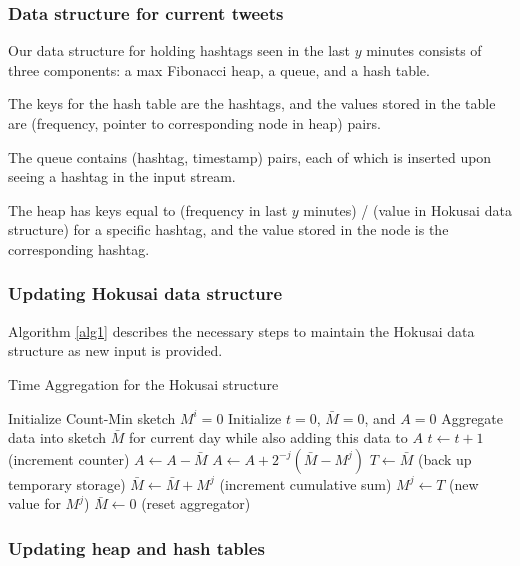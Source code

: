 \documentclass[a4paper,12pt]{article}
\begin{document}
\subsubsection{Data structure for current tweets}

Our data structure for holding hashtags seen in the last $y$ minutes consists of three components: a max Fibonacci heap, a queue, and a hash table.

The keys for the hash table are the hashtags, and the values stored in the table are (frequency, pointer to corresponding node in heap) pairs.

The queue contains (hashtag, timestamp) pairs, each of which is inserted upon seeing a hashtag in the input stream.

The heap has keys equal to (frequency in last $y$ minutes) / (value in Hokusai data structure) for a specific hashtag, and the value stored in the node is the corresponding hashtag.

\subsubsection{Updating Hokusai data structure\label{Hokusai}}

Algorithm \ref{alg1} describes the necessary steps to maintain the Hokusai data structure as new input is provided.

\begin{algorithm}
\caption{Time Aggregation for the Hokusai structure}\label{alg1}
\begin{algorithmic}[1]
	\State Initialize Count-Min sketch $M^i = 0$
\EndFor
\State Initialize $t = 0$, $\bar{M} = 0$, and $A = 0$
	\State Aggregate data into sketch $\bar{M}$ for current day while also adding this data to $A$
	\State $t \leftarrow t + 1$ (increment counter)
	\State $A \leftarrow A - \bar{M}$
		\State $A \leftarrow A + 2^{-j}(\bar{M} - M^j)$
		\State $T \leftarrow \bar{M}$ (back up temporary storage)
		\State $\bar{M} \leftarrow \bar{M} + M^j$ (increment cumulative sum)
		\State $M^j \leftarrow T$ (new value for $M^j$)
	\EndFor
	\State $\bar{M} \leftarrow 0$ (reset aggregator)
\EndWhile
\end{algorithmic}
\end{algorithm}

\subsubsection{Updating heap and hash tables}
\end{document}
